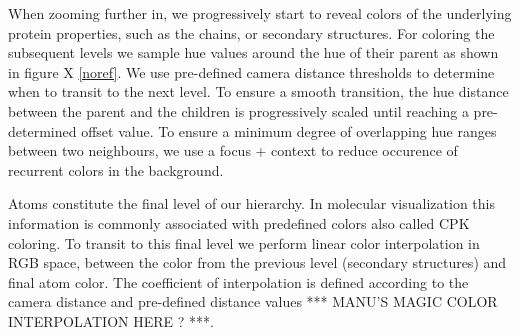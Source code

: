 \documentclass[review,journal]{vgtc}         %
\begin{document}
When zooming further in, we progressively start to reveal colors of the underlying protein properties, such as the chains, or secondary structures.
For coloring the subsequent levels we sample hue values around the hue of their parent as shown in figure X \ref{noref}.
We use pre-defined camera distance thresholds to determine when to transit to the next level.
To ensure a smooth transition, the hue distance between the parent and the children is progressively scaled until reaching a pre-determined offset value.
To ensure a minimum degree of overlapping hue ranges between two neighbours, we use a focus + context to reduce occurence of recurrent colors in the background.

Atoms constitute the final level of our hierarchy.
In molecular visualization this information is commonly associated with predefined colors also called CPK coloring.
To transit to this final level we perform linear color interpolation in RGB space, between the color from the previous level (secondary structures) and final atom color.
The coefficient of interpolation is defined according to the camera distance and pre-defined distance values *** MANU'S MAGIC COLOR INTERPOLATION HERE ? ***.

%
%
%
%
%
\end{document}
